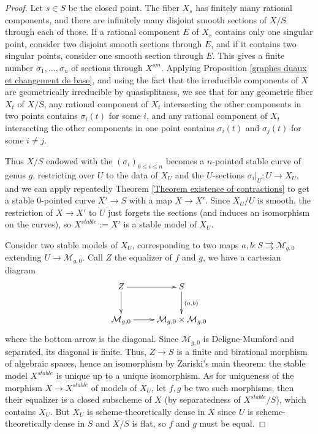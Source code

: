 \documentclass[a4paper,12pt]{amsart} %
\numberwithin{equation}{subsection}
\newcommand{\ca}[1]{{\mathcal{#1}}}
\theoremstyle{definition}
\theoremstyle{plain}%
\theoremstyle{remark}
\begin{document}
\begin{proof}
Let $s\in S$ be the closed point. The fiber $X_s$ has finitely many rational components, and there are infinitely many disjoint smooth sections of $X/S$ through each of those. If a rational component $E$ of $X_s$ contains only one singular point, consider two disjoint smooth sections through $E$, and if it contains two singular points, consider one smooth section through $E$. This gives a finite number $\sigma_1,...,\sigma_n$ of sections through $X^{sm}$. Applying Proposition \ref{graphes duaux et changement de base}, and using the fact that the irreducible components of $X$ are geometrically irreducible by quasisplitness, we see that for any geometric fiber $X_t$ of $X/S$, any rational component of $X_t$ intersecting the other components in two points contains $\sigma_i(t)$ for some $i$, and any rational component of $X_t$ intersecting the other components in one point contains $\sigma_i(t)$ and $\sigma_j(t)$ for some $i\neq j$.

Thus $X/S$ endowed with the $(\sigma_i)_{0\leq i\leq n}$ becomes a $n$-pointed stable curve of genus $g$, restricting over $U$ to the data of $X_U$ and the $U$-sections $\sigma_i|_U:U\to X_U$, and we can apply repeatedly Theorem \ref{Theorem existence of contractions} to get a stable $0$-pointed curve $X'\to S$ with a map $X\to X'$. Since $X_U/U$ is smooth, the restriction of $X\to X'$ to $U$ just forgets the sections (and induces an isomorphism on the curves), so $X^{stable}:=X'$ is a stable model of $X_U$.

Consider two stable models of $X_U$, corresponding to two maps $a,b \colon S \rightrightarrows \ca M_{g,0}$ extending $U \to \ca M_{g,0}$. Call $Z$ the equalizer of $f$ and $g$, we have a cartesian diagram
\[
\xymatrix{
Z\ar[r]\ar[d] & S \ar[d]^{(a,b)} \\
\ca M_{g,0} \ar[r] & \ca M_{g,0} \times \ca M_{g,0}
}
\]
where the bottom arrow is the diagonal. Since $\mathcal{M}_{g,0}$ is Deligne-Mumford and separated, its diagonal is finite. Thus, $Z \to S$ is a finite and birational morphism of algebraic spaces, hence an isomorphism by Zariski's main theorem: the stable model $X^{stable}$ is unique up to a unique isomorphism. As for uniqueness of the morphism $X\to X^{stable}$ of models of $X_U$, let $f,g$ be two such morphisms, then their equalizer is a closed subscheme of $X$ (by separatedness of $X^{stable}/S$), which contains $X_U$. But $X_U$ is scheme-theoretically dense in $X$ since $U$ is scheme-theoretically dense in $S$ and $X/S$ is flat, so $f$ and $g$ must be equal.
\end{proof}
\end{document}
